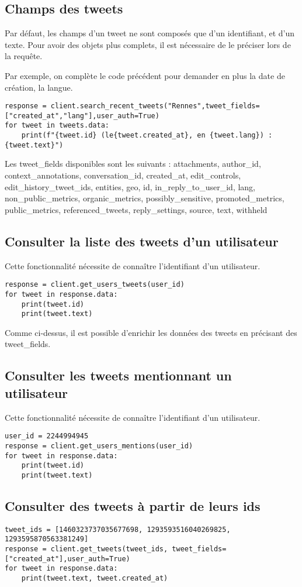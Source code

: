 \documentclass[11pt,a4paper]{article}
\begin{document}
\subsection{Champs des tweets}

Par défaut, les champs d'un tweet ne sont composés que d'un identifiant, et d'un texte. Pour avoir des objets plus complets, il est nécessaire de le préciser lors de la requête. 

Par exemple, on complète le code précédent pour demander en plus la date de création, la langue.
\begin{lstlisting}
response = client.search_recent_tweets("Rennes",tweet_fields=["created_at","lang"],user_auth=True)
for tweet in tweets.data:
    print(f"{tweet.id} (le{tweet.created_at}, en {tweet.lang}) : {tweet.text}") 
\end{lstlisting} 

Les tweet\_fields disponibles sont les suivants : 
attachments, author\_id, context\_annotations, conversation\_id, created\_at, edit\_controls, edit\_history\_tweet\_ids, entities, geo, id, in\_reply\_to\_user\_id, lang, non\_public\_metrics, organic\_metrics, possibly\_sensitive, promoted\_metrics, public\_metrics, referenced\_tweets, reply\_settings, source, text, withheld

\subsection{Consulter la liste des tweets d'un utilisateur}
Cette fonctionnalité nécessite de connaître l'identifiant d'un utilisateur.

\begin{lstlisting}
response = client.get_users_tweets(user_id)
for tweet in response.data:
    print(tweet.id)
    print(tweet.text)
\end{lstlisting}  
Comme ci-dessus, il est possible d'enrichir les données des tweets en précisant des tweet\_fields.

\subsection{Consulter les tweets mentionnant un utilisateur}
Cette fonctionnalité nécessite de connaître l'identifiant d'un utilisateur. 

\begin{lstlisting}
user_id = 2244994945
response = client.get_users_mentions(user_id)
for tweet in response.data:
    print(tweet.id)
    print(tweet.text)
\end{lstlisting} 

\subsection{Consulter des tweets à partir de leurs ids}

\begin{lstlisting}
tweet_ids = [1460323737035677698, 1293593516040269825, 1293595870563381249]
response = client.get_tweets(tweet_ids, tweet_fields=["created_at"],user_auth=True)
for tweet in response.data:
    print(tweet.text, tweet.created_at)
\end{lstlisting}  
\end{document}
